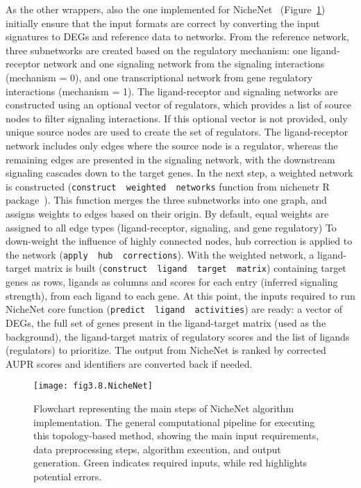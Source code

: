 As the other wrappers, also the one implemented for NicheNet~\cite{RN42} (Figure~\ref{fig:fig3.8.NicheNet}) initially ensure that the input formats are correct by converting the input signatures to \gls{DEGs} and reference data to networks.
From the reference network, three subnetworks are created based on the regulatory mechanism: one ligand-receptor network and one signaling network from the signaling interactions (mechanism = 0), and one transcriptional network from gene regulatory interactions (mechanism = 1).
The ligand-receptor and signaling networks are constructed using an optional vector of regulators, which provides a list of source nodes to filter signaling interactions.
If this optional vector is not provided, only unique source nodes are used to create the set of regulators.
The ligand-receptor network includes only edges where the source node is a regulator, whereas the remaining edges are presented in the signaling network, with the downstream signaling cascades down to the target genes.
In the next step, a weighted network is constructed (\texttt{construct \ weighted \ networks} function from nichenetr \gls{R} package~\cite{RN42}).
This function merges the three subnetworks into one graph, and assigns weights to edges based on their origin. By default, equal weights are assigned to all edge types (ligand-receptor, signaling, and gene regulatory)
To down-weight the influence of highly connected nodes, hub correction is applied to the network (\texttt{apply \ hub \ corrections}).
With the weighted network, a ligand-target matrix is built (\texttt{construct \ ligand \ target \ matrix}) containing target genes as rows, ligands as columns and scores for each entry (inferred signaling strength), from each ligand to each gene.
At this point, the inputs required to run NicheNet core function (\texttt{predict \ ligand \ activities}) are ready: a vector of \gls{DEGs}, the full set of genes present in the ligand-target matrix (used as the background), the ligand-target matrix of regulatory scores and the list of ligands (regulators) to prioritize.
The output from NicheNet is ranked by corrected \gls{AUPR} scores and identifiers are converted back if needed.

\begin{figure}[htbp]
    \centering
    \texttt{[image: fig3.8.NicheNet]}
    \caption[Flowchart representing the main steps of NicheNet algorithm implementation.]{Flowchart representing the main steps of NicheNet algorithm implementation. The general computational pipeline for executing this topology-based method, showing the main input requirements, data preprocessing steps, algorithm execution, and output generation. Green indicates required inputs, while red highlights potential errors.}
    \label{fig:fig3.8.NicheNet}
\end{figure}

